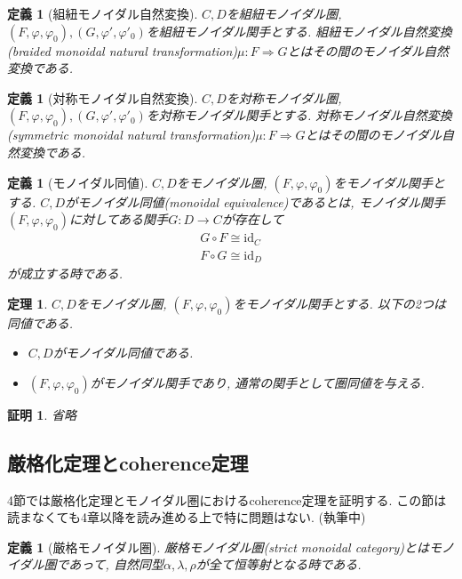 \documentclass[a4paper,12pt]{ltjsarticle}
\theoremstyle{break}
\newtheorem{defn}[thm]{定義}
\newtheorem{thrm}[thm]{定理}
\newtheorem*{prf}{証明}
\newcommand{\id}{\mathrm{id}}
\newcommand{\ci}{\circ}
\newcommand{\al}{\alpha}
\newcommand{\la}{\lambda}
\newcommand{\vp}{\varphi}
\newcommand{\ra}{\Rightarrow}
\numberwithin{equation}{section}
\begin{document}
\begin{defn}[組紐モノイダル自然変換]
  $C,D$を組紐モノイダル圏, $(F,\vp,\vp_0),(G,\vp',\vp'_0)$を組紐モノイダル関手とする.  
  組紐モノイダル自然変換(braided monoidal natural transformation)$\mu: F \ra G$とはその間のモノイダル自然変換である. 
\end{defn}

\begin{defn}[対称モノイダル自然変換]
  $C,D$を対称モノイダル圏, $(F,\vp,\vp_0),(G,\vp',\vp'_0)$を対称モノイダル関手とする.  
  対称モノイダル自然変換(symmetric monoidal natural transformation)$\mu: F \ra G$とはその間のモノイダル自然変換である. 
\end{defn}

\begin{defn}[モノイダル同値]
  $C,D$をモノイダル圏, $(F,\vp,\vp_0)$をモノイダル関手とする. 
  $C,D$がモノイダル同値(monoidal equivalence)であるとは, モノイダル関手$(F,\vp,\vp_0)$に対してある関手$G: D \to C$が存在して
  \begin{align*}
    G \ci F \cong \id_C \\
    F \ci G \cong \id_D
  \end{align*}  
  が成立する時である. 
\end{defn} 

\begin{thrm}
  $C,D$をモノイダル圏, $(F,\vp,\vp_0)$をモノイダル関手とする. 以下の2つは同値である. 
  \begin{itemize}
    \item $C,D$がモノイダル同値である. 
    \item $(F,\vp,\vp_0)$がモノイダル関手であり, 通常の関手として圏同値を与える. 
  \end{itemize}
\end{thrm}

\begin{prf}
  省略
\end{prf}

\subsection{厳格化定理とcoherence定理}

4節では厳格化定理とモノイダル圏におけるcoherence定理を証明する. 
この節は読まなくても4章以降を読み進める上で特に問題はない. 
(執筆中)

\begin{defn}[厳格モノイダル圏]
  厳格モノイダル圏(strict monoidal category)とはモノイダル圏であって, 自然同型$\al,\la,\rho$が全て恒等射となる時である. 
\end{defn}
\end{document}
